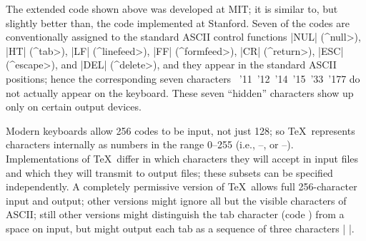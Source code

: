 The extended code shown above was developed at MIT; it is similar to, but
slightly better than, the code implemented at Stanford. Seven of the codes
are conventionally assigned to the standard ASCII control functions
|NUL| (^\<null>), |HT| (^\<tab>), |LF| (^\<linefeed>), |FF|
(^\<formfeed>), |CR| (^\<return>), |ESC| (^\<escape>), and
|DEL| (^\<delete>), and they appear in the standard ASCII positions; hence the
corresponding seven characters
{\tentex{}~\char'11~\char'12~\char'14~\char'15~\char'33~\char'177}
do not actually appear on the keyboard. These seven ``hidden''
characters show up only on certain output devices.

Modern keyboards allow 256 codes to be input, not just 128; so \TeX\
represents characters internally as numbers in the range 0--255 (i.e.,
\oct{000}--\oct{377}, or \hex{00}--\hex{FF}). Implementations of \TeX\
differ in which characters they will accept in input files and which
they will transmit to output files; these subsets can be specified
independently. A completely permissive version of \TeX\ allows full
256-character input and output; other versions might ignore all
but the visible characters of ASCII; still other versions might
distinguish the tab character (code \oct{011}) from a space on input,
but might output each tab as a sequence of three characters |^^I|.

